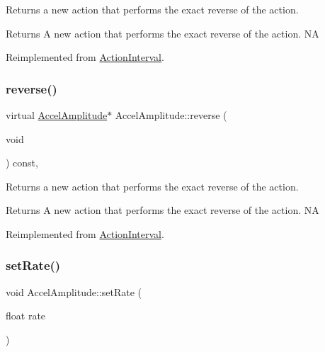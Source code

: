 Returns a new action that performs the exact reverse of the action.

\begin{DoxyReturn}{Returns}
A new action that performs the exact reverse of the action.  NA 
\end{DoxyReturn}


Reimplemented from \hyperlink{classActionInterval_a9f9ac7164036a0bc261a72f62a2b2da7}{Action\+Interval}.

\mbox{\label{classAccelAmplitude_aba6902dd2e533d43c0544f35d440c330}} 
\subsubsection{\texorpdfstring{reverse()}{reverse()}\hspace{0.1cm}{\footnotesize\ttfamily [2/2]}}
{\footnotesize\ttfamily virtual \hyperlink{classAccelAmplitude}{Accel\+Amplitude}$\ast$ Accel\+Amplitude\+::reverse (\begin{DoxyParamCaption}\item[{void}]{ }\end{DoxyParamCaption}) const\hspace{0.3cm}{\ttfamily [override]}, {\ttfamily [virtual]}}

Returns a new action that performs the exact reverse of the action.

\begin{DoxyReturn}{Returns}
A new action that performs the exact reverse of the action.  NA 
\end{DoxyReturn}


Reimplemented from \hyperlink{classActionInterval_a9f9ac7164036a0bc261a72f62a2b2da7}{Action\+Interval}.

\mbox{\label{classAccelAmplitude_a9d6078516cdd0489b0c4b2665e634e3f}} 
\subsubsection{\texorpdfstring{set\+Rate()}{setRate()}\hspace{0.1cm}{\footnotesize\ttfamily [1/2]}}
{\footnotesize\ttfamily void Accel\+Amplitude\+::set\+Rate (\begin{DoxyParamCaption}\item[{float}]{rate }\end{DoxyParamCaption})\hspace{0.3cm}{\ttfamily [inline]}}



